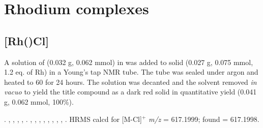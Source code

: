 



\section{Rhodium complexes}


\subsection*{[Rh(\tBusixantphosk)Cl]}


A solution of \tBusixantphos{} (0.032 g, 0.062 mmol) in  was added to solid \ce{[Rh(COE)2Cl]} (0.027 g, 0.075 mmol, 1.2 eq. of Rh) in a Young's tap NMR tube.  The tube was sealed under argon and heated to 60 \degC{} for 24 hours.  The solution was decanted and the solvent removed \emph{in vacuo} to yield the title compound as a dark red solid in quantitative yield (0.041 g, 0.062 mmol, 100\%).

.
,
,
,
,
.
,
,
,
,
,
,
,
,
.
HRMS calcd for  [M-Cl]$^+$ \emph{m/z} = 617.1999; found = 617.1998.


